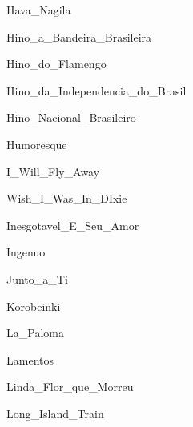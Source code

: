 \documentclass{article}
\begin{document}

{Hava_Nagila}


{Hino_a_Bandeira_Brasileira}


{Hino_do_Flamengo}


{Hino_da_Independencia_do_Brasil}


{Hino_Nacional_Brasileiro}


{Humoresque}


{I_Will_Fly_Away}


{Wish_I_Was_In_DIxie}


{Inesgotavel_E_Seu_Amor}


{Ingenuo}


{Junto_a_Ti}


{Korobeinki}


{La_Paloma}


{Lamentos}


{Linda_Flor_que_Morreu}


{Long_Island_Train}
\end{document}
